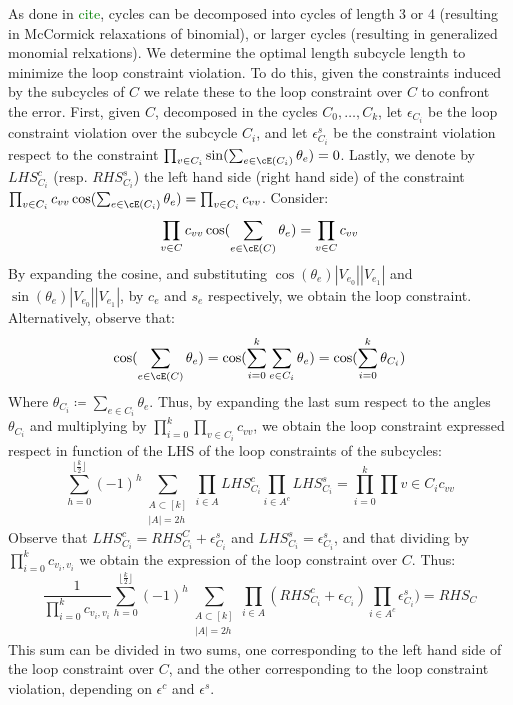 \documentclass{article}
\begin{document}
As done in \textcolor{green}{cite}, cycles can be decomposed into cycles of length 3 or 4 (resulting in McCormick relaxations of binomial), 
or larger cycles (resulting in generalized monomial relxations).
%
We determine the optimal length subcycle length to minimize the loop constraint violation.
%
To do this, given the constraints induced by the subcycles of \(C\) we relate these to the loop constraint over \(C\) to confront the error.
%
First, given \(C\), decomposed in the cycles \(C_0,\ldots,C_k\), let \(\epsilon_{C_i}\) be the loop constraint violation over the subcycle \(C_i\), and let \(\epsilon^{s}_{C_i}\) be the constraint violation respect to the constraint \(\prod_{v \in C_i} \sin(\sum_{e \in \cE(C_i)}\theta_e) = 0\).
Lastly, we denote by \(LHS^{c}_{C_i}\) (resp. \(RHS^{s}_{C_i}\)) the left hand side (right hand side) of the constraint \(\prod_{v \in C_i}c_{vv}\cos(\sum_{e \in \cE(C_i)}\theta_e) = \prod_{v \in C_i}c_{vv}\).
Consider:
\[
\prod_{v \in C}c_{vv}\cos(\sum_{e \in \cE(C)}\theta_e) = \prod_{v \in C}c_{vv}
\]
By expanding the cosine, and substituting \(\cos(\theta_e)|V_{e_0}||V_{e_1}|\) and  \(\sin(\theta_e)|V_{e_0}||V_{e_1}|\), by \(c_{e}\) and \(s_e\) respectively, we obtain the loop constraint.
Alternatively, observe that:
\[
\cos(\sum_{e \in \cE(C)} \theta_e) = \cos(\sum_{i = 0}^k \sum_{e \in C_i}\theta_e) = \cos(\sum_{i = 0}^k \theta_{C_i})
\]
Where \(\theta_{C_i} \coloneqq \sum_{e \in C_i}\theta_e\). 
%
Thus, by expanding the last sum respect to the angles \(\theta_{C_i}\) 
and multiplying by \(\prod_{i=0}^k\prod_{v \in C_i}c_{vv}\), 
we obtain the loop constraint expressed respect in function of the LHS of the loop constraints of the subcycles:
\[
\sum_{h=0}^{\lfloor\frac{k}{2}\rfloor}(-1)^h\sum_{\substack{A \subset [k] \\ |A| = 2h}}\prod_{i \in A}LHS^{c}_{C_i}\prod_{i \in A^c}LHS^{s}_{C_i} = \prod_{i=0}^k\prod{v\in C_i}c_{vv}
\]
Observe that \(LHS^c_{C_i} = RHS^C_{C_i} + \epsilon^s_{C_i}\) and \(LHS^s_{C_i} = \epsilon^s_{C_i}\), and that dividing by \(\prod_{i = 0}^k c_{v_i,v_i}\) we obtain the expression of the loop constraint over \(C\).
Thus:
\[
\frac{1}{\prod_{i = 0}^k c_{v_i,v_i}}\sum_{h=0}^{\lfloor\frac{k}{2}\rfloor}(-1)^h\sum_{\substack{A \subset [k] \\ |A| = 2h}}\prod_{i \in A}(RHS^{c}_{C_i}+ \epsilon_{C_i})\prod_{i \in A^c}\epsilon^s_{C_i}) = RHS_{C}
\]
This sum can be divided in two sums, one corresponding to the left hand side of the loop constraint over \(C\),  and the other corresponding to the loop constraint violation, depending on \(\epsilon^c\) and \(\epsilon^s\).
\end{document}
